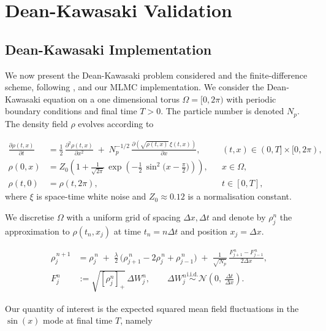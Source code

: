 \section{Dean-Kawasaki Validation}\label{sec:dk_validation}

\subsection{Dean-Kawasaki Implementation}\label{sec:dk_implementation} 
We now present the Dean-Kawasaki problem considered and the finite-difference scheme,
following \cite{cornalba2025multilevel}, and our MLMC 
implementation.
We consider the Dean-Kawasaki equation on a one dimensional torus
$\Omega=[0,2\pi)$ with periodic boundary conditions and final time $T>0$.
The particle number is denoted $N_p$. The density 
field $\rho$ evolves according to

\begin{align}
\frac{\partial \rho(t,x)}{\partial t}
&= \frac{1}{2}\,\frac{\partial^2 \rho(t,x)}{\partial x^2}
\;+\; N_p^{-1/2}\,\frac{\partial \!\left(\sqrt{\rho(t,x)}\,\xi(t,x)\right)}{\partial x},
&& (t,x)\in (0,T]\times [0, 2\pi),
\label{eq:dk_spde_problem}\\[4pt]
\rho(0,x)
&= Z_0\!\left(1+\frac{1}{\sqrt{2\pi}}
\,\exp\!\left(-\tfrac{1}{2}\,\sin^2\!\big(x-\tfrac{\pi}{2}\big)\right)\right),
&& x\in\Omega, \nonumber\\
\rho(t,0) &= \rho(t,2\pi), &&t \in [0,T], \nonumber
\end{align}
where $\xi$ is space-time white noise and $Z_0 \approx 
0.12$ is a normalisation constant.

We discretise $\Omega$ with a uniform grid of spacing 
$\Delta x, \Delta t$ and denote by $\rho_j^n$ the approximation
to $\rho(t_n, x_j)$ at time $t_n = n \Delta t$ and position $x_j = 
\Delta x$.

\begin{align}
\rho_j^{\,n+1}
&= \rho_j^{\,n}
\;+\; \tfrac{\lambda}{2}\,\bigl(\rho_{j+1}^{\,n}-2\rho_j^{\,n}+\rho_{j-1}^{\,n}\bigr)
\;+\; \tfrac{1}{\sqrt{N_p}}\,
\frac{F_{j+1}^{\,n}-F_{j-1}^{\,n}}{2\Delta x}, \label{eq:dk_fd}\\[4pt]
F_j^n &:= \sqrt{[\rho_j^n]_+}\,\Delta W_j^n, \qquad
\Delta W_j^n \overset{\text{i.i.d.}}{\sim} \mathcal{N}\!\left(0,\ \tfrac{\Delta t}{\Delta x}\right).
\nonumber
\end{align}

Our quantity of interest is the expected squared mean field fluctuations
in the $\sin(x)$ mode at final time $T$, namely

